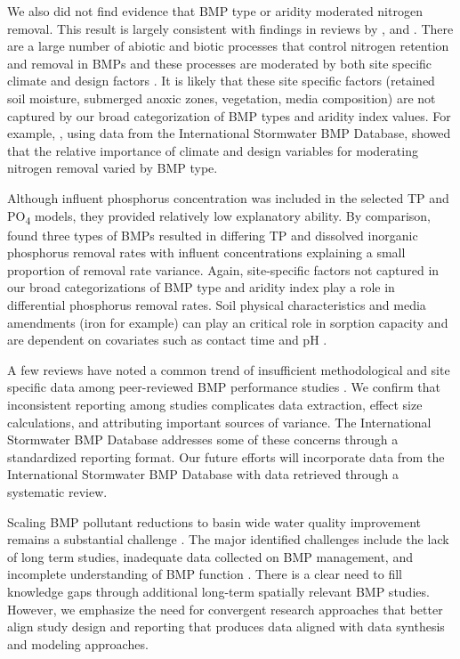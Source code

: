 \documentclass[utf8]{FrontiersinHarvard}
\begin{document}
We also did not find evidence that BMP type or aridity moderated nitrogen removal.
This result is largely consistent with findings in reviews by \citet{kochNitrogenRemovalStormwater2014}, \citet{hagerPerformanceLowimpactDevelopment2019} and \citet{horvathEffectsRegionalClimate2023}.
There are a large number of abiotic and biotic processes that control nitrogen retention and removal in BMPs and these processes are moderated by both site specific climate and design factors \citep{lefevreReviewDissolvedPollutants2015, valencaNitrateRemovalUncertainty2021}.
It is likely that these site specific factors (retained soil moisture, submerged anoxic zones, vegetation, media composition) are not captured by our broad categorization of BMP types and aridity index values.
For example, \citet{valencaNitrateRemovalUncertainty2021}, using data from the International Stormwater BMP Database, showed that the relative importance of climate and design variables for moderating nitrogen removal varied by BMP type.

Although influent phosphorus concentration was included in the selected TP and PO\textsubscript{4} models, they provided relatively low explanatory ability.
By comparison, \citet{horvathEffectsRegionalClimate2023} found three types of BMPs resulted in differing TP and dissolved inorganic phosphorus removal rates with influent concentrations explaining a small proportion of removal rate variance.
Again, site-specific factors not captured in our broad categorizations of BMP type and aridity index play a role in differential phosphorus removal rates.
Soil physical characteristics and media amendments (iron for example) can play an critical role in sorption capacity and are dependent on covariates such as contact time and pH \citep{hoganBestManagementPractices2007, lefevreReviewDissolvedPollutants2015}.

A few reviews have noted a common trend of insufficient methodological and site specific data among peer-reviewed BMP performance studies \citep{grudzinskiDoesRiparianFencing2020, eagleMetaAnalysisConstrained2017, liuReviewEffectivenessBest2017}.
We confirm that inconsistent reporting among studies complicates data extraction, effect size calculations, and attributing important sources of variance.
The International Stormwater BMP Database addresses some of these concerns through a standardized reporting format.
Our future efforts will incorporate data from the International Stormwater BMP Database with data retrieved through a systematic review.

Scaling BMP pollutant reductions to basin wide water quality improvement remains a substantial challenge \citep{tomerChallengeDocumentingWater2011, mellandEffectsAgriculturalLand2018, mealsLagTimeWater2010}.
The major identified challenges include the lack of long term studies, inadequate data collected on BMP management, and incomplete understanding of BMP function \citep{linternBestManagementPractices2020, liuReviewEffectivenessBest2017}.
There is a clear need to fill knowledge gaps through additional long-term spatially relevant BMP studies.
However, we emphasize the need for convergent research approaches that better align study design and reporting that produces data aligned with data synthesis and modeling approaches.
\end{document}

